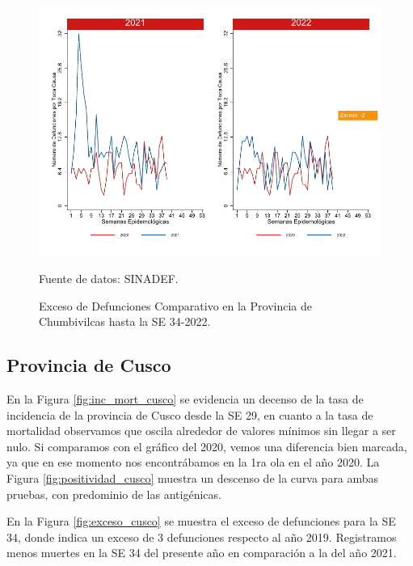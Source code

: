 \documentclass[12pt,a4paper,openany]{book}
\begin{document}
	\begin{figure}[h]
		\caption{Exceso de Defunciones Comparativo en la Provincia de Chumbivilcas hasta la SE 34-2022.}\label{fig:exceso_chumbivilcas}
		\begin{center}
			\includegraphics[width=0.7\linewidth]{../figuras/exceso_6.pdf}
		\end{center}
		{\footnotesize {Fuente de datos: SINADEF.}}
	\end{figure}
	
	\clearpage
	
	\subsection*{Provincia de Cusco}
	\noindent En la Figura \ref{fig:inc_mort_cusco} se evidencia un decenso de la tasa de incidencia de la provincia de Cusco desde la SE 29, en cuanto a la tasa de mortalidad observamos que oscila alrededor de valores mínimos sin llegar a ser nulo. Si comparamos con el gráfico del 2020, vemos una diferencia bien marcada, ya que en ese momento nos encontrábamos en la 1ra ola en el año 2020. 
	\noindent La  Figura \ref{fig:positividad_cusco} muestra un descenso de la curva para ambas pruebas, con predominio de las antigénicas.
	
	En la Figura \ref{fig:exceso_cusco} se muestra el exceso de defunciones para la SE 34, donde indica un exceso de 3 defunciones respecto al año 2019. Registramos menos muertes en la SE 34 del presente año en comparación a la del año 2021.
	
\end{document}
